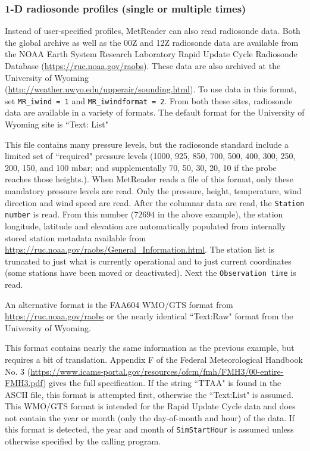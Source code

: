 \documentclass[11pt]{article}   %
\begin{document}
\subsubsection{1-D radiosonde profiles (single or multiple times)}
Instead of user-specified profiles, MetReader can also read radiosonde data.
Both the global archive as well as the 00Z and 12Z radiosonde data are
available from the NOAA Earth System Research Laboratory Rapid Update Cycle
Radiosonde Database (\url{https://ruc.noaa.gov/raobs}).  These data
are also archived at the University of Wyoming\\
(\url{http://weather.uwyo.edu/upperair/sounding.html}).
To use data in this format, set \texttt{MR\_iwind = 1} and \texttt{MR\_iwindformat = 2}.
From both these sites, radiosonde data are available in a variety of formats.
The default format for the University of Wyoming site is ``Text: List"

\small  \normalsize

This file contains many pressure levels, but the radiosonde standard include
a limited set of ``required" pressure levels (1000, 925, 850, 700, 500,
400, 300, 250, 200, 150, and 100 $\mathrm{mbar}$; and supplementally 
70, 50, 30, 20, 10 if the probe reaches those heights.).
When MetReader reads a file of this format, only these mandatory pressure levels are
read.  Only the pressure, height, temperature, wind direction and wind speed are read.
After the columnar data are read, the \texttt{Station number} is read.  From this number
($72694$ in the above example), the station longitude, latitude and elevation are
automatically populated from internally stored station
metadata available from \url{https://ruc.noaa.gov/raobs/General\_Information.html}.  The
station list is truncated to just what is currently operational and to just current
coordinates (some stations have been moved or deactivated).
Next the \texttt{Observation time} is read.  

An alternative format is the FAA604 WMO/GTS format from \url{https://ruc.noaa.gov/raobs}
or the nearly identical ``Text:Raw" format from the University of Wyoming.

\small  \normalsize

This format contains nearly the same information as the previous example, but 
requires a bit of translation.
Appendix F of the Federal Meteorological Handbook No. 3
(\url{https://www.icams-portal.gov/resources/ofcm/fmh/FMH3/00-entire-FMH3.pdf})
gives the full specification.
If the string ``TTAA" is found
in the ASCII file, this format is attempted first, otherwise the ``Text:List" is
assumed.  This WMO/GTS format is intended for the Rapid Update Cycle data and
does not contain the year or month (only the day-of-month and hour) of the data.
If this format is detected, the year and month of \texttt{SimStartHour}
is assumed unless otherwise specified by the calling program.
\end{document}
